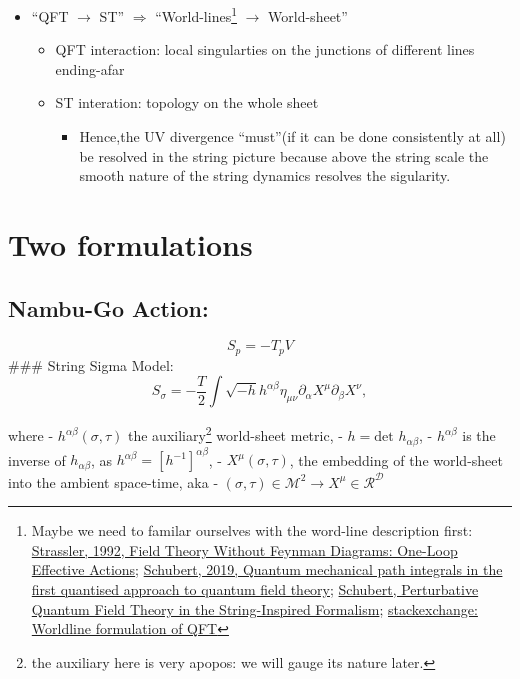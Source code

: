 \documentclass[
]{book}
\providecommand{\tightlist}{%
  \setlength{\itemsep}{0pt}\setlength{\parskip}{0pt}}
\begin{document}
\begin{itemize}
\tightlist
\item
  ``QFT \(\rightarrow\) ST'' \(\Rightarrow\) ``World-lines\footnote{Maybe we need to familar ourselves with the word-line description first:
    \href{https://arxiv.org/abs/hep-ph/9205205}{Strassler, 1992, Field Theory Without Feynman Diagrams: One-Loop Effective Actions}; \href{https://arxiv.org/abs/1912.10004}{Schubert, 2019, Quantum mechanical path integrals in the first quantised approach to quantum field theory}; \href{https://arxiv.org/abs/hep-th/0101036}{Schubert, Perturbative Quantum Field Theory in the String-Inspired Formalism}; \href{https://physics.stackexchange.com/questions/522717/worldline-formulation-of-qft}{stackexchange: Worldline formulation of QFT}} \(\rightarrow\) World-sheet''

  \begin{itemize}
  \tightlist
  \item
    QFT interaction: local singularties on the junctions of different lines ending-afar
  \item
    ST interation: topology on the whole sheet

    \begin{itemize}
    \tightlist
    \item
      Hence,the UV divergence ``must''(if it can be done consistently at all) be resolved in the string picture because above the string scale the smooth nature of the string dynamics resolves the sigularity.
    \end{itemize}
  \end{itemize}
\end{itemize}

\hypertarget{two-formulations}{%
\section{Two formulations}\label{two-formulations}}

\hypertarget{nambu-go-action}{%
\subsection{Nambu-Go Action:}\label{nambu-go-action}}

\[
S_{p} = -T_{p}V
\]
\#\#\# String Sigma Model:
\[
S_{\sigma} = - \frac{T}{2} \int \sqrt{-h} h^{\alpha\beta}\eta_{\mu\nu}
\partial_{\alpha}X^{\mu}
\partial_{\beta}X^{\nu},
\]

where
- \(h^{\alpha\beta}(\sigma, \tau)\) the auxiliary\footnote{the auxiliary here is very apopos: we will gauge its nature later.} world-sheet metric,
- \(h=\text{det} \,\, h_{\alpha\beta}\),
- \(h^{\alpha\beta}\) is the inverse of \(h_{\alpha\beta}\), as \(h^{\alpha\beta} = [h^{-1}]^{\alpha\beta}\),
- \(X^{\mu}(\sigma, \tau)\), the embedding of the world-sheet into the ambient space-time, aka
- \((\sigma, \tau) \in \mathcal{M}^2 \rightarrow X^{\mu} \in \mathcal{R}^\mathcal{D}\)
\end{document}

